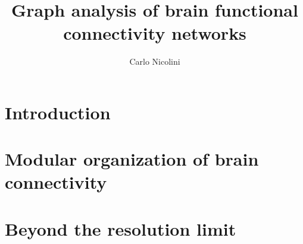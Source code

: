 
%

\title{Graph analysis of brain functional connectivity networks}
\author{Carlo Nicolini}

\newtheorem{obs}{Observation}
\newtheorem{props}{Proposition}



\maketitle
{}

\tableofcontents
\listoftodos

%

%

%


\chapter{Introduction}\label{chap:introduction}
	

\chapter{Modular organization of brain connectivity}\label{chap:modularorganization}
	

\chapter{Beyond the resolution limit}\label{chap:beyondresolutionlimit}
	

